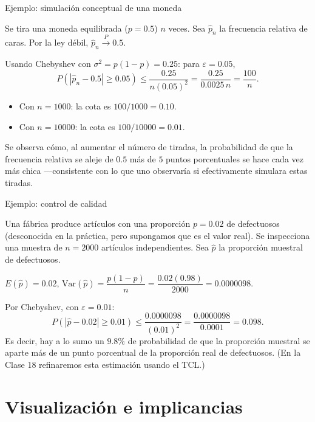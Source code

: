 \documentclass[aspectratio=169,11pt]{beamer}
\begin{document}
\begin{frame}{Ejemplo: simulación conceptual de una moneda}
\begin{example}
Se tira una moneda equilibrada ($p=0.5$) $n$ veces. Sea $\hat{p}_n$ la frecuencia relativa de caras. Por la ley débil, $\hat p_n \xrightarrow{P} 0.5$.

\medskip
Usando Chebyshev con $\sigma^2 = p(1-p) = 0.25$: para $\varepsilon = 0.05$,
\[
P(|\hat p_n - 0.5| \geq 0.05) \leq \frac{0.25}{n(0.05)^2} = \frac{0.25}{0.0025\, n} = \frac{100}{n}.
\]
\begin{itemize}
\item Con $n=1000$: la cota es $100/1000 = 0.10$.
\item Con $n=10000$: la cota es $100/10000 = 0.01$.
\end{itemize}
Se observa cómo, al aumentar el número de tiradas, la probabilidad de que la frecuencia relativa se aleje de $0.5$ más de $5$ puntos porcentuales se hace cada vez más chica —consistente con lo que uno observaría si efectivamente simulara estas tiradas.
\end{example}
\end{frame}

\begin{frame}{Ejemplo: control de calidad}
\begin{example}
Una fábrica produce artículos con una proporción $p=0.02$ de defectuosos (desconocida en la práctica, pero supongamos que es el valor real). Se inspecciona una muestra de $n=2000$ artículos independientes. Sea $\hat p$ la proporción muestral de defectuosos.

\medskip
$E(\hat p) = 0.02$, $\text{Var}(\hat p) = \dfrac{p(1-p)}{n} = \dfrac{0.02(0.98)}{2000} = 0.0000098$.

Por Chebyshev, con $\varepsilon = 0.01$:
\[
P(|\hat p - 0.02| \geq 0.01) \leq \frac{0.0000098}{(0.01)^2} = \frac{0.0000098}{0.0001} = 0.098.
\]
Es decir, hay a lo sumo un $9.8\%$ de probabilidad de que la proporción muestral se aparte más de un punto porcentual de la proporción real de defectuosos. (En la Clase 18 refinaremos esta estimación usando el TCL.)
\end{example}
\end{frame}

\section{Visualización e implicancias}
\end{document}
